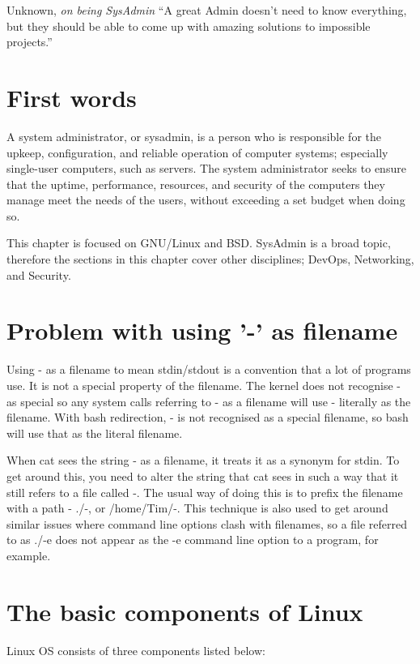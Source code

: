 \begin{chapquote}{Unknown, \textit{on being SysAdmin}}
``A great Admin doesn't need to know everything, but they should be able to come up with amazing solutions to impossible projects.''
\end{chapquote}

\section{First words}

A system administrator, or sysadmin, is a person who is responsible for the upkeep, configuration, and reliable operation of computer systems; especially single-user computers, such as servers. The system administrator seeks to ensure that the uptime, performance, resources, and security of the computers they manage meet the needs of the users, without exceeding a set budget when doing so. 

This chapter is focused on GNU/Linux and BSD.  SysAdmin is a broad topic, therefore the sections in this chapter cover other disciplines; DevOps, Networking, and Security.

\section{Problem with using '-' as filename}
Using - as a filename to mean stdin/stdout is a convention that a lot of programs use. It is not a special property of the filename. The kernel does not recognise - as special so any system calls referring to - as a filename will use - literally as the filename.  With bash redirection, - is not recognised as a special filename, so bash will use that as the literal filename.

When cat sees the string - as a filename, it treats it as a synonym for stdin. To get around this, you need to alter the string that cat sees in such a way that it still refers to a file called -. The usual way of doing this is to prefix the filename with a path - ./-, or /home/Tim/-. This technique is also used to get around similar issues where command line options clash with filenames, so a file referred to as ./-e does not appear as the -e command line option to a program, for example.

\section{The basic components of Linux}

Linux OS consists of three components listed below:

